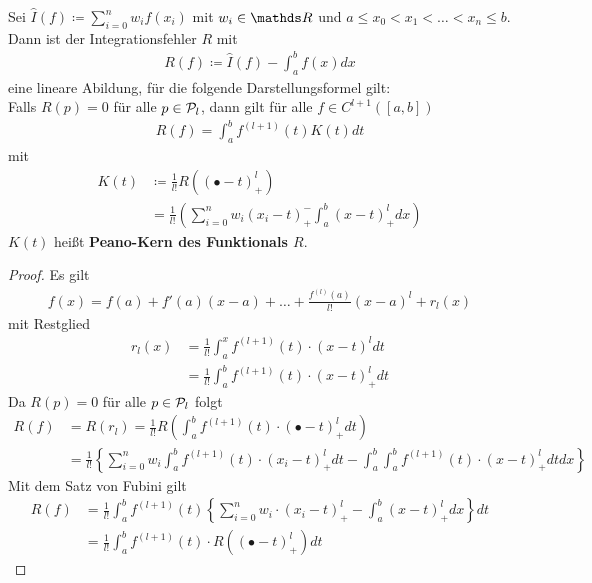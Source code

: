 \begin{Satze}
  Sei $\hat{I}(f)\coloneqq \sum_{i=0}^n w_if(x_i)$ mit $w_i\in\R$ und
  $a\leq x_0<x_1<\ldots <x_n\leq b$.
  Dann ist der Integrationsfehler $R$ mit 
  \begin{gather}
    R(f) \coloneqq \hat{I}(f) - \int_a^b f(x) dx
    \label{VII.2.5}
  \end{gather}
  eine lineare Abildung, für die folgende Darstellungsformel gilt:
  \\
  Falls $R(p)=0$ für alle $p\in\mathcal{P}_l$, dann gilt 
  für alle $f\in C^{l+1}([a,b])$
  \begin{gather}
    R(f) = \int_a^bf^{(l+1)}(t) K(t) dt
    \label{VII.2.6}
  \end{gather}
  mit 
  \begin{align}\nonumber
    K(t) &\coloneqq \frac{1}{l!}
           R\left( 
           (\bullet -t)_+^l
           \right)\\
         &= \frac{1}{l!}\left( \sum_{i=0}^n w_i(x_i-t)_+^-\int_a^b(x-t)_+^ldx  \right)
           \label{VII.2.7}
  \end{align}
  $K(t)$ heißt \textbf{Peano-Kern des Funktionals
    $R$}.
  \begin{proof}
    Es gilt
    \begin{gather*}
      f(x) = f(a) + f'(a)(x-a) +\ldots + \frac{f^{(l)}(a)}{l!}(x-a)^l + r_l(x)
    \end{gather*}
    mit Restglied 
    \begin{align*}
      r_l(x) &= \frac{1}{l!} \int_a^xf^{(l+1)} (t)\cdot (x-t)^l dt\\
             &= \frac{1}{l!} \int_a^bf^{(l+1)} (t)\cdot (x-t)_+^l dt
    \end{align*}
    Da $R(p)=0$ für alle $p\in\mathcal{P}_l$ folgt
    \begin{align*}
      R(f) &= R(r_l)
             = \frac{1}{l!} R\left(\int_a^bf^{(l+1)} (t)\cdot(\bullet-t)_+^l
             dt\right)\\
           &=\frac{1}{l!}\left\{ \sum_{i=0}^n w_i \int_a^b f^{(l+1)}(t)
             \cdot (x_i-t)_+^ldt  
             - \int_a^b\int_a^b  f^{(l+1)}(t) \cdot (x-t)_+^ldtdx  \right\}
    \end{align*}
    Mit dem Satz von Fubini gilt
    \begin{align*}
      R(f) &= \frac{1}{l!}\int_a^bf^{(l+1)}(t) 
             \left\{ 
             \sum_{i=0}^n w_i  \cdot (x_i-t)_+^l  
             - \int_a^b(x-t)_+^ldx  \right\}
             dt\\
           &= \frac{1}{l!} \int_a^bf^{(l+1)}(t) 
             \cdot R\left( (\bullet -t)_+^l\right) dt    
    \end{align*}
  \end{proof}
\end{Satze}

